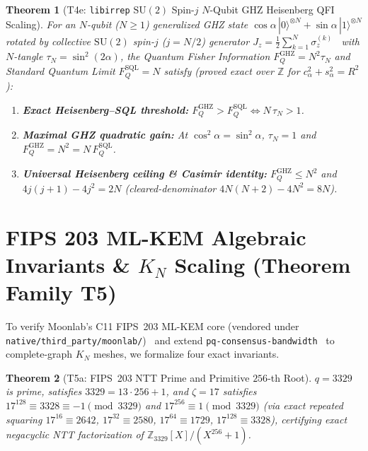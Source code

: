 \documentclass[11pt,reqno]{amsart}
\newtheorem{theorem}{Theorem}[section]
\theoremstyle{definition}
\newcommand{\Z}{\mathbb{Z}}
\newcommand{\code}[1]{\texttt{\small #1}}
\begin{document}
\begin{theorem}[T4e: \code{libirrep} $\mathrm{SU}(2)$ Spin-$j$ $N$-Qubit GHZ Heisenberg QFI Scaling]
\label{thm:t4e}
For an $N$-qubit ($N \ge 1$) generalized GHZ state $\cos\alpha\,|0\rangle^{\otimes N} + \sin\alpha\,|1\rangle^{\otimes N}$ rotated by collective $\mathrm{SU}(2)$ spin-$j$ ($j = N/2$) generator $J_z = \frac{1}{2}\sum_{k=1}^N \sigma_z^{(k)}$~\cite{giovannetti2006,tsotchke_libirrep} with $N$-tangle $\tau_N = \sin^2(2\alpha)$, the Quantum Fisher Information $F_Q^{\mathrm{GHZ}} = N^2 \tau_N$ and Standard Quantum Limit $F_Q^{\mathrm{SQL}} = N$ satisfy (proved exact over $\Z$ for $c_\alpha^2 + s_\alpha^2 = R^2$):
\begin{enumerate}[leftmargin=1.8em]
  \item \textbf{Exact Heisenberg--SQL threshold:} $F_Q^{\mathrm{GHZ}} > F_Q^{\mathrm{SQL}} \iff N\,\tau_N > 1$.
  \item \textbf{Maximal GHZ quadratic gain:} At $\cos^2\alpha = \sin^2\alpha$, $\tau_N = 1$ and $F_Q^{\mathrm{GHZ}} = N^2 = N\,F_Q^{\mathrm{SQL}}$.
  \item \textbf{Universal Heisenberg ceiling \& Casimir identity:} $F_Q^{\mathrm{GHZ}} \le N^2$ and $4j(j+1) - 4j^2 = 2N$ (cleared-denominator $4N(N+2) - 4N^2 = 8N$).
\end{enumerate}
\end{theorem}

\section{FIPS 203 ML-KEM Algebraic Invariants \& \texorpdfstring{$K_N$}{KN} Scaling (Theorem Family T5)}
\label{sec:fips203}

To verify Moonlab's C11 FIPS~203 ML-KEM core (vendored under \code{native/third\_party/\allowbreak moonlab/})~\cite{tsotchke_moonlab,nist_fips203} and extend \code{pq-consensus-bandwidth}~\cite{tsotchke_pqcb} to complete-graph $K_N$ meshes, we formalize four exact invariants.

\begin{theorem}[T5a: FIPS~203 NTT Prime and Primitive $256$-th Root]
\label{thm:t5a}
$q = 3329$ is prime, satisfies $3329 = 13 \cdot 256 + 1$, and $\zeta = 17$ satisfies $17^{128} \equiv 3328 \equiv -1 \pmod{3329}$ and $17^{256} \equiv 1 \pmod{3329}$ (via exact repeated squaring $17^{16}\equiv 2642$, $17^{32}\equiv 2580$, $17^{64}\equiv 1729$, $17^{128}\equiv 3328$), certifying exact negacyclic NTT factorization of $\Z_{3329}[X]/(X^{256}+1)$.
\end{theorem}
\end{document}
